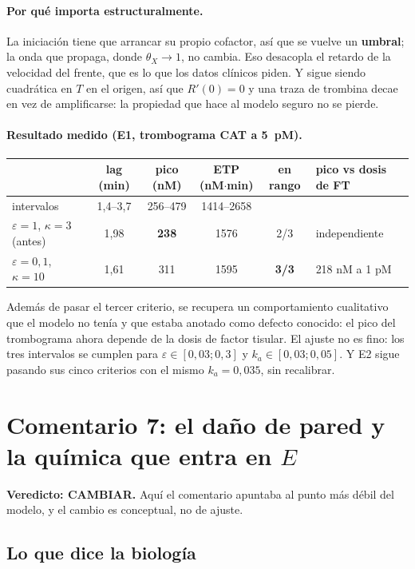 \documentclass[11pt,a4paper]{article}
\newcommand{\CAMB}{\textcolor{chg}{\textbf{CAMBIAR}}}
\begin{document}
\paragraph{Por qué importa estructuralmente.} La iniciación tiene que arrancar su
propio cofactor, así que se vuelve un \textbf{umbral}; la onda que propaga, donde
$\theta_X\to1$, no cambia. Eso desacopla el retardo de la velocidad del frente,
que es lo que los datos clínicos piden. Y sigue siendo cuadrática en $T$ en el
origen, así que $R'(0)=0$ y una traza de trombina decae en vez de amplificarse: la
propiedad que hace al modelo seguro no se pierde.

\paragraph{Resultado medido (E1, trombograma CAT a 5~pM).}
\begin{center}
\small
\begin{tabular}{@{}lccccl@{}}
\toprule
 & lag (min) & pico (nM) & ETP (nM$\cdot$min) & en rango & pico vs dosis de FT \\
\midrule
intervalos & 1{,}4--3{,}7 & 256--479 & 1414--2658 & & \\
$\varepsilon=1$, $\kappa=3$ (antes) & 1{,}98 & \textbf{238} & 1576 & 2/3 & independiente \\
$\varepsilon=0{,}1$, $\kappa=10$ & 1{,}61 & 311 & 1595 & \textbf{3/3} & 218 nM a 1 pM \\
\bottomrule
\end{tabular}
\end{center}

\noindent
Además de pasar el tercer criterio, se recupera un comportamiento cualitativo que
el modelo no tenía y que estaba anotado como defecto conocido: el pico del
trombograma ahora depende de la dosis de factor tisular. El ajuste no es fino:
los tres intervalos se cumplen para $\varepsilon\in[0{,}03;0{,}3]$ y
$k_a\in[0{,}03;0{,}05]$. Y E2 sigue pasando sus cinco criterios con el mismo
$k_a=0{,}035$, sin recalibrar.

\section{Comentario 7: el daño de pared y la química que entra en $E$}

\textbf{Veredicto: \CAMB.} Aquí el comentario apuntaba al punto más débil del
modelo, y el cambio es conceptual, no de ajuste.

\subsection{Lo que dice la biología}
\end{document}
